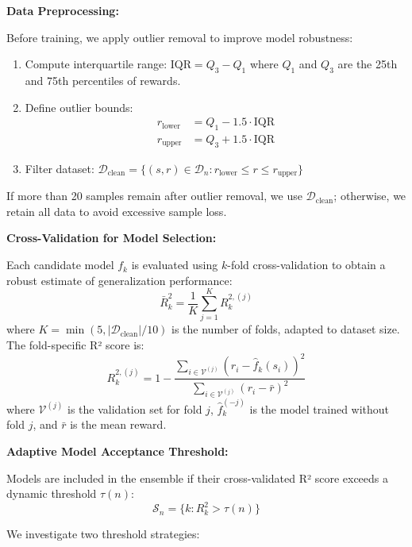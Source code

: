 \documentclass[conference]{IEEEtran}
\begin{document}
\textbf{Data Preprocessing:}

Before training, we apply outlier removal to improve model robustness:
\begin{enumerate}
    \item Compute interquartile range: $\text{IQR} = Q_3 - Q_1$ where $Q_1$ and $Q_3$ are the 25th and 75th percentiles of rewards.
    \item Define outlier bounds:
    \begin{align}
    r_{\text{lower}} &= Q_1 - 1.5 \cdot \text{IQR} \\
    r_{\text{upper}} &= Q_3 + 1.5 \cdot \text{IQR}
    \end{align}
    \item Filter dataset: $\mathcal{D}_{\text{clean}} = \{(s, r) \in \mathcal{D}_n : r_{\text{lower}} \leq r \leq r_{\text{upper}}\}$
\end{enumerate}

If more than 20 samples remain after outlier removal, we use $\mathcal{D}_{\text{clean}}$; otherwise, we retain all data to avoid excessive sample loss.

\textbf{Cross-Validation for Model Selection:}

Each candidate model $f_k$ is evaluated using $k$-fold cross-validation to obtain a robust estimate of generalization performance:
\begin{equation}
\bar{R}_{k}^{2} = \frac{1}{K} \sum_{j=1}^{K} R_{k}^{2,(j)}
\end{equation}
where $K = \min(5, |\mathcal{D}_{\text{clean}}|/10)$ is the number of folds, adapted to dataset size. The fold-specific R² score is:
\begin{equation}
R_{k}^{2,(j)} = 1 - \frac{\sum_{i \in \mathcal{V}^{(j)}} (r_i - \hat{f}_k(s_i))^2}
{\sum_{i \in \mathcal{V}^{(j)}} (r_i - \bar{r})^2}
\end{equation}
where $\mathcal{V}^{(j)}$ is the validation set for fold $j$, $\hat{f}_k^{(-j)}$ is the model trained without fold $j$, and $\bar{r}$ is the mean reward.

\textbf{Adaptive Model Acceptance Threshold:}

Models are included in the ensemble if their cross-validated R² score exceeds a dynamic threshold $\tau(n)$:
\begin{equation}
\mathcal{S}_n = \{k : R^2_k > \tau(n)\}
\end{equation}

We investigate two threshold strategies:
\end{document}
